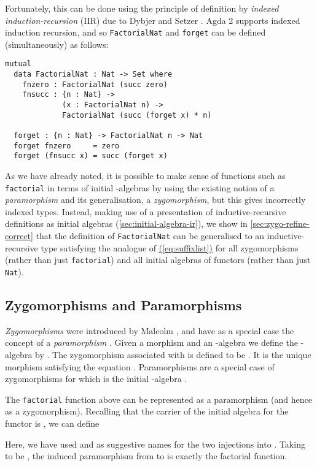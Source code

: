 \documentclass{LMCS}
\newcommand{\parenref}[1]{\hyperref[#1]{(\ref*{#1})}}
\begin{document}
Fortunately, this can be done using the principle of definition by
\emph{indexed induction-recursion} (IIR) due to Dybjer and Setzer
\cite{dybjer03induction,dybjer06indexed}. Agda 2 supports indexed
induction recursion, and so \texttt{FactorialNat} and \texttt{forget}
can be defined (simultaneously) as follows:
\begin{verbatim}
mutual
  data FactorialNat : Nat -> Set where
    fnzero : FactorialNat (succ zero)
    fnsucc : {n : Nat} ->
             (x : FactorialNat n) ->
             FactorialNat (succ (forget x) * n)

  forget : {n : Nat} -> FactorialNat n -> Nat
  forget fnzero     = zero
  forget (fnsucc x) = succ (forget x)
\end{verbatim}
\noindent
As we have already noted, it is possible to make sense of functions
such as \texttt{factorial} in terms of initial -algebras by using the
existing notion of a \emph{paramorphism} and its generalisation, a
\emph{zygomorphism}, but this gives incorrectly indexed types.
Instead, making use of a presentation of inductive-recursive
definitions as initial algebras (\autoref{sec:initial-algebra-ir}), we
show in \autoref{sec:zygo-refine-correct} that the definition of
\texttt{FactorialNat} can be generalised to an inductive-recursive
type satisfying the analogue of \parenref{eq:suffixlist} for all
zygomorphisms (rather than just \verb|factorial|) and all initial
algebras of functors (rather than just \verb|Nat|).

\subsection{Zygomorphisms and Paramorphisms}\label{sec:para-zygo}

\emph{Zygomorphisms} were introduced by Malcolm \cite{malcolm90}, and
have as a special case the concept of a \emph{paramorphism}
\cite{meertens92paramorphism}. Given a morphism  and an -algebra  we define the
-algebra 
by .
The zygomorphism  associated with  is
defined to be . It is the unique morphism satisfying the equation . Paramorphisms are a
special case of zygomorphisms for which  is the initial
-algebra .

The \texttt{factorial} function above can be represented as a
paramorphism (and hence as a zygomorphism). Recalling that the carrier
of the initial algebra for the functor  is
, we can define

Here, we have used  and  as suggestive
names for the two injections into . Taking  to be
, the induced paramorphism from  to
 is exactly the factorial function.
\end{document}
